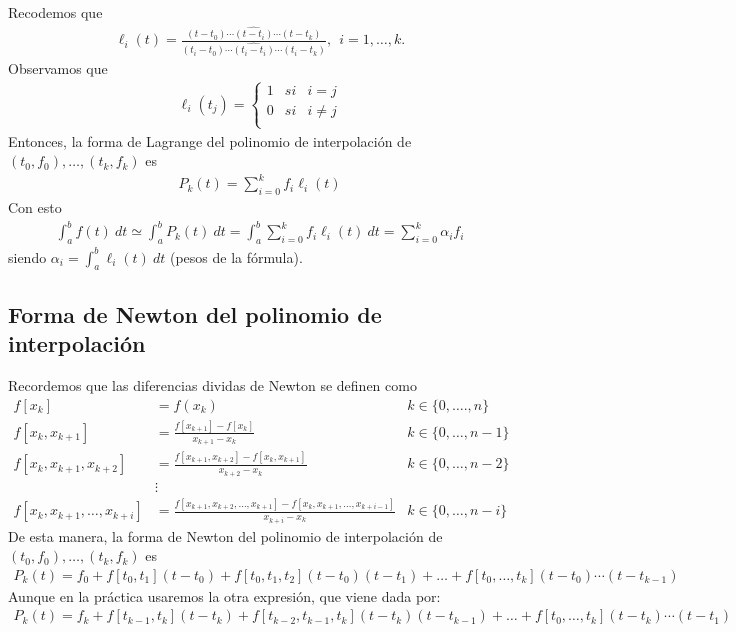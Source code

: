 \noindent Recodemos que 
\begin{align*}
    \ell_i(t) = \frac{(t-t_0) \cdots \widehat{(t - t_i)} \cdots (t - t_k)}{(t_i - t_0) \cdots \widehat{(t_i - t_i)} \cdots (t_i - t_k)},\ \ i = 1,\ldots,k.
\end{align*}
Observamos que 
\begin{align*}
    \ell_i(t_j) = \left\{ \begin{array}{lcc}
             1 & si & i = j\\
             0 & si & i \not = j \\
             \end{array}
   \right.
\end{align*}
Entonces, la forma de Lagrange del polinomio de interpolación de $(t_0,f_0),\ldots,(t_k,f_k)$ es
\begin{align*}
    P_k(t) = \sum_{i=0}^{k} f_i\ell_i(t)
\end{align*}
Con esto
\begin{align*}
    \int_{a}^{b} f(t) \ dt \simeq \int_{a}^{b} P_k(t) \ dt = \int_{a}^{b} \sum_{i=0}^{k} f_i\ell_i(t) \ dt = \sum_{i=0}^{k} \alpha_i f_i
\end{align*}
siendo $\alpha_i = \int_{a}^{b} \ell_i(t) \ dt$ (pesos de la fórmula).

\subsection{Forma de Newton del polinomio de interpolación}

\noindent Recordemos que las diferencias dividas de Newton se definen como
\begin{align*}
    f[x_k] &= f(x_k) & k \in \{0,\ldots.,n\} \\
    f[x_k,x_{k+1}] &= \frac{f[x_{k+1}] - f[x_k]}{x_{k+1} - x_k} & k \in \{0,\ldots,n-1\} \\
    f[x_k,x_{k+1},x_{k+2}] &= \frac{f[x_{k+1},x_{k+2}] - f[x_k,x_{k+1}]}{x_{k+2} - x_k} & k \in \{0,\ldots,n-2\} \\
    & \vdots \\
    f[x_k,x_{k+1},\ldots,x_{k+i}] &= \frac{f[x_{k+1},x_{k+2},\ldots,x_{k+1}] - f[x_k,x_{k+1},\ldots,x_{k+i-1}]}{x_{k+i}-x_k} & k \in \{0,\ldots,n-i\}
\end{align*}
De esta manera, la forma de Newton del polinomio de interpolación de $(t_0,f_0),\ldots,(t_k,f_k)$ es
\begin{align*}
    P_k(t) = f_0 + f[t_0,t_1](t-t_0) + f[t_0,t_1,t_2](t-t_0)(t-t_1) + \ldots + f[t_0,\ldots,t_k](t-t_0)\cdots(t-t_{k-1})
\end{align*}
Aunque en la práctica usaremos la otra expresión, que viene dada por:
\begin{align*}
    P_k(t) = f_k + f[t_{k-1},t_k](t-t_k) + f[t_{k-2},t_{k-1},t_k](t-t_k)(t-t_{k-1}) + \ldots + f[t_0,\ldots,t_k](t-t_k)\cdots (t-t_1)
\end{align*}

